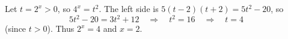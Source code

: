 Let $t=2^x>0$, so $4^x=t^2$. The left side is $5(t-2)(t+2)=5t^2-20$, so
\[5t^2-20=3t^2+12\quad\Longrightarrow\quad t^2=16\quad\Longrightarrow\quad t=4\]
(since $t>0$). Thus $2^x=4$ and $x=\boxed{2}$.
